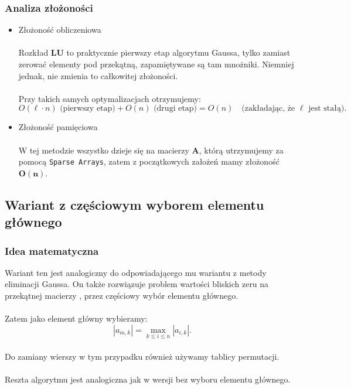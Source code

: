 \documentclass{article}
\begin{document}
\subsubsection{Analiza złożoności}
\begin{itemize}
    \item Złożoność obliczeniowa
    \\ \\
    Rozkład $\mathbf{LU}$ to praktycznie pierwszy etap algorytmu Gaussa, tylko zamiast zerować elementy pod przekątną, zapamiętywane są tam mnożniki. Niemniej jednak, nie zmienia to całkowitej złożoności.
\\ \\
Przy takich samych optymalizacjach otrzymujemy:
\[
O(\ell \cdot n) \text{ (pierwszy etap)} + O(n) \text{ (drugi etap)} = O(n) \quad \text{(zakładając, że } \ell \text{ jest stałą)}.
\]
    \item Złożoność pamięciowa
    \\ \\
    W tej metodzie wszystko dzieje się na macierzy $\mathbf{A}$, którą utrzymujemy za pomocą \texttt{Sparse Arrays}, zatem z początkowych założeń mamy złożoność $\mathbf{O(n)}$.
\end{itemize}
\subsection{Wariant z częściowym wyborem elementu głównego}
\subsubsection{Idea matematyczna}
Wariant ten jest analogiczny do odpowiadającego mu wariantu z metody eliminacji Gaussa.
On także rozwiązuje problem wartości bliskich zeru na przekątnej macierzy , przez częściowy wybór elementu głównego.
 \\ \\ Zatem jako element główny wybieramy:
 \[
 |a_{m,k}| = \max_{k \leq i \leq n} |a_{i,k}|.
 \]
 \\ Do zamiany wierszy w tym przypadku również używamy tablicy permutacji.
 \\ \\ Reszta algorytmu jest analogiczna jak w wersji bez wyboru elementu głównego.
\end{document}
